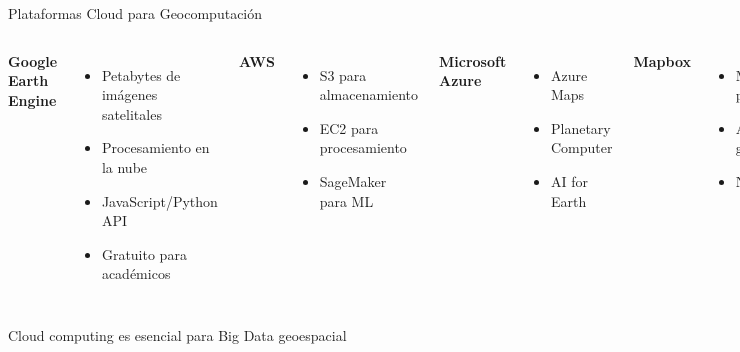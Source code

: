 \documentclass[10pt]{beamer}
\begin{document}
\begin{frame}{Plataformas Cloud para Geocomputación}
    \begin{columns}
        \textbf{ Google Earth Engine}
        \begin{itemize}
            \item Petabytes de imágenes satelitales
            \item Procesamiento en la nube
            \item JavaScript/Python API
            \item Gratuito para académicos
        \end{itemize}
        
        \vspace{0.3cm}
        \textbf{ AWS}
        \begin{itemize}
            \item S3 para almacenamiento
            \item EC2 para procesamiento
            \item SageMaker para ML
        \end{itemize}
        
        \textbf{ Microsoft Azure}
        \begin{itemize}
            \item Azure Maps
            \item Planetary Computer
            \item AI for Earth
        \end{itemize}
        
        \vspace{0.3cm}
        \textbf{ Mapbox}
        \begin{itemize}
            \item Mapas personalizados
            \item APIs de geocoding
            \item Navegación
        \end{itemize}
    \end{columns}
    
    \vspace{0.3cm}
    \begin{center}
        \textcolor{usachred}{} Cloud computing es esencial para Big Data geoespacial
    \end{center}
\end{frame}
\end{document}
